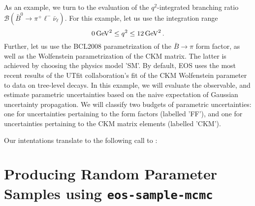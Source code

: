 As an example, we turn to the evaluation of the $q^2$-integrated branching ratio
$\mathcal{B}(\bar{B}^0\to \pi^+\ell^-\bar\nu_\ell)$.
For this example, let us use the integration range
\begin{equation*}
    0\,\mathrm{GeV}^2 \leq q^2 \leq 12\,\mathrm{GeV}^2\,.
\end{equation*}
Further, let us use the BCL2008 \cite{Bourrely:2008za} parametrization of the $\bar{B}\to \pi$ form factor,
as well as the Wolfenstein parametrization of the CKM matrix. The latter is achieved
by choosing the physics model 'SM'. By default, EOS uses the most recent results of
the UTfit collaboration's fit of the CKM Wolfenstein parameter to data on tree-level decays.
In this example, we will evaluate the observable, and estimate parametric uncertainties
based on the naive expectation of Gaussian uncertainty propagation. We will classify two
budgets of parametric uncertainties: one for uncertainties pertaining to the form factors
(labelled 'FF'), and one for uncertainties pertaining to the CKM matrix elements (labelled 'CKM').

Our intentations translate to the following call to :

\section{Producing Random Parameter Samples using \textbf{\texttt{eos-sample-mcmc}}}
\label{sec:usage:eos-sample-mcmc}

